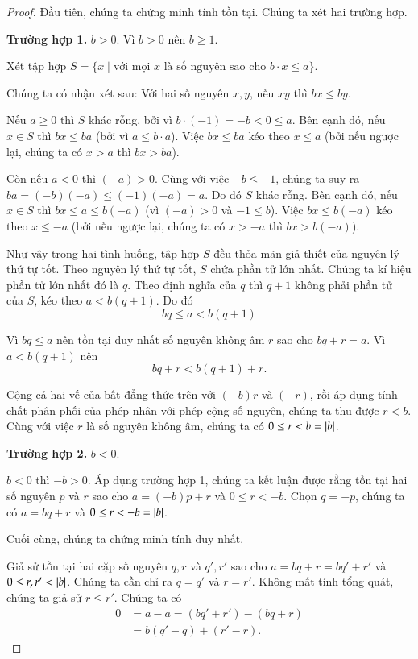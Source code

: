 \begin{proof}
	Đầu tiên, chúng ta chứng minh tính tồn tại. Chúng ta xét hai trường hợp.

	\textbf{Trường hợp 1.} $b > 0$. Vì $b > 0$ nên $b\geq 1$.

	Xét tập hợp $S = \{ x \mid \text{với mọi $x$ là số nguyên sao cho $b\cdot x\leq a$} \}$.

	Chúng ta có nhận xét sau: Với hai số nguyên $x, y$, nếu $xy$ thì $bx \leq by$.
	\bigskip

	Nếu $a\geq 0$ thì $S$ khác rỗng, bởi vì $b\cdot (-1) = -b < 0 \leq a$. Bên cạnh đó, nếu $x\in S$ thì $bx \leq ba$ (bởi vì $a\leq b\cdot a$). Việc $bx \leq ba$ kéo theo $x\leq a$ (bởi nếu ngược lại, chúng ta có $x > a$ thì $bx > ba$).

	Còn nếu $a < 0$ thì $(-a) > 0$. Cùng với việc $-b\leq -1$, chúng ta suy ra $ba = (-b)(-a)\leq (-1)(-a) = a$. Do đó $S$ khác rỗng. Bên cạnh đó, nếu $x\in S$ thì $bx \leq a\leq b(-a)$ (vì $(-a) > 0$ và $-1\leq b$). Việc $bx\leq b(-a)$ kéo theo $x\leq -a$ (bởi nếu ngược lại, chúng ta có $x > -a$ thì $bx > b(-a)$).

	Như vậy trong hai tình huống, tập hợp $S$ đều thỏa mãn giả thiết của nguyên lý thứ tự tốt. Theo nguyên lý thứ tự tốt, $S$ chứa phần tử lớn nhất. Chúng ta kí hiệu phần tử lớn nhất đó là $q$. Theo định nghĩa của $q$ thì $q+1$ không phải phần tử của $S$, kéo theo $a < b(q + 1)$. Do đó
	\[
		bq\leq a < b(q + 1)
	\]

	Vì $bq\leq a$ nên tồn tại duy nhất số nguyên không âm $r$ sao cho $bq + r = a$. Vì $a < b(q + 1)$ nên
	\[
		bq + r < b(q + 1) + r.
	\]

	Cộng cả hai vế của bất đẳng thức trên với $(-b)r$ và $(-r)$, rồi áp dụng tính chất phân phối của phép nhân với phép cộng số nguyên, chúng ta thu được $r < b$. Cùng với việc $r$ là số nguyên không âm, chúng ta có $0\leq r < b = \left\vert{b}\right\vert$.

	\textbf{Trường hợp 2.} $b < 0$.

	$b < 0$ thì $-b > 0$. Áp dụng trường hợp 1, chúng ta kết luận được rằng tồn tại hai số nguyên $p$ và $r$ sao cho $a = (-b)p + r$ và $0\leq r < -b$. Chọn $q = -p$, chúng ta có $a = bq + r$ và $0\leq r < -b = \left\vert{b}\right\vert$.

	\bigskip

	Cuối cùng, chúng ta chứng minh tính duy nhất.

	Giả sử tồn tại hai cặp số nguyên $q, r$ và $q', r'$ sao cho $a = bq + r = bq' + r'$ và $0\leq r, r' < \left\vert{b}\right\vert$. Chúng ta cần chỉ ra $q = q'$ và $r = r'$. Không mất tính tổng quát, chúng ta giả sử $r\leq r'$. Chúng ta có
	\begin{align*}
		0 & = a - a = (bq' + r') - (bq + r) \\
		  & = b(q' - q) + (r' - r).
	\end{align*}


\end{proof}
